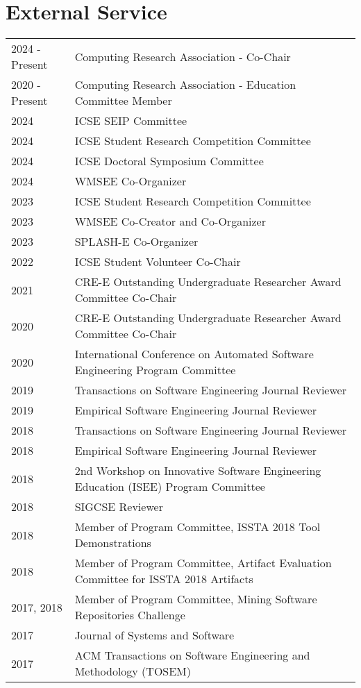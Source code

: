 \documentclass[10pt]{article}
\begin{document}
%
\vspace{15pt}
\section{External Service}

\noindent\begin{tabular}{p{2.5cm}p{10.5cm}}
2024 -Present & Computing Research Association - Co-Chair\\
2020 -Present & Computing Research Association - Education Committee Member\\
2024 & ICSE SEIP Committee\\
2024 & ICSE Student Research Competition Committee\\
2024 & ICSE Doctoral Symposium Committee\\
2024 & WMSEE Co-Organizer\\
2023 & ICSE Student Research Competition Committee\\
2023 & WMSEE Co-Creator and Co-Organizer\\
2023 & SPLASH-E Co-Organizer\\
2022 & ICSE Student Volunteer Co-Chair\\
2021 & CRE-E Outstanding Undergraduate Researcher Award Committee Co-Chair\\
2020 & CRE-E Outstanding Undergraduate Researcher Award Committee Co-Chair\\
2020 & International Conference on Automated Software Engineering Program Committee\\
2019 & Transactions on Software Engineering Journal Reviewer\\
2019 & Empirical Software Engineering Journal Reviewer\\
2018 & Transactions on Software Engineering Journal Reviewer\\
2018 & Empirical Software Engineering Journal Reviewer\\
2018 & 2nd Workshop on Innovative Software Engineering Education (ISEE) Program Committee \\
2018 & SIGCSE Reviewer \\
2018 & Member of Program Committee, ISSTA 2018 Tool Demonstrations \\
2018 & Member of Program Committee, Artifact Evaluation Committee for ISSTA 2018 Artifacts \\
2017, 2018 & Member of Program Committee, Mining Software Repositories Challenge \\
2017 & Journal of Systems and Software \\
2017 & ACM Transactions on Software Engineering and Methodology (TOSEM) \\


\end{tabular}
\end{document}
